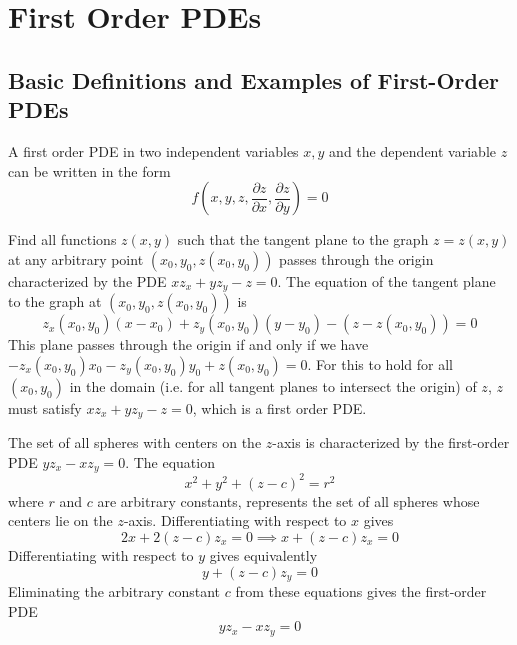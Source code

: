 %
%
%
\chapter{First Order PDEs}
\label{FirstPDE} %


\section{Basic Definitions and Examples of First-Order PDEs}

\begin{definition}
    A first order PDE in two independent variables $x,y$ and the dependent variable $z$ can be written in the form \begin{equation}
        f\left(x,y,z,\frac{\partial z}{\partial x},\frac{\partial z}{\partial y}\right) = 0 
    \end{equation}
\end{definition}

\begin{example}
    Find all functions $z(x,y)$ such that the tangent plane to the graph $z = z(x,y)$ at any arbitrary point $(x_0,y_0,z(x_0,y_0))$ passes through the origin characterized by the PDE $xz_x+yz_y - z=0$. The equation of the tangent plane to the graph at $(x_0,y_0,z(x_0,y_0))$ is \begin{equation*}
        z_x(x_0,y_0)(x-x_0) + z_y(x_0,y_0)(y-y_0)-(z-z(x_0,y_0)) = 0
    \end{equation*}
    This plane passes through the origin if and only if we have $-z_x(x_0,y_0)x_0 - z_y(x_0,y_0)y_0+z(x_0,y_0) = 0$. For this to hold for all $(x_0,y_0)$ in the domain (i.e. for all tangent planes to intersect the origin) of $z$, $z$ must satisfy $xz_x + yz_y - z = 0$, which is a first order PDE.
\end{example}

\begin{example}
    The set of all spheres with centers on the $z$-axis is characterized by the first-order PDE $yz_x-xz_y = 0$. The equation $$x^2+y^2+(z-c)^2=r^2$$ where $r$ and $c$ are arbitrary constants, represents the set of all spheres whose centers lie on the $z$-axis. Differentiating with respect to $x$ gives $$2x+2(z-c)z_x = 0\implies x+(z-c)z_x = 0$$ Differentiating with respect to $y$ gives equivalently $$y+(z-c)z_y = 0$$ Eliminating the arbitrary constant $c$ from these equations gives the first-order PDE $$yz_x-xz_y = 0$$
\end{example}

